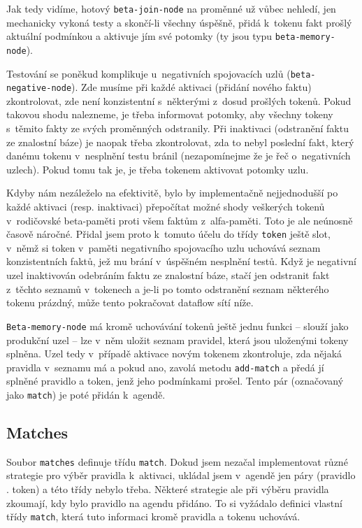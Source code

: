Jak tedy vidíme, hotový \verb|beta-join-node| na proměnné už vůbec nehledí,
jen mechanicky vykoná testy a skončí-li všechny úspěšně, přidá k~tokenu
fakt prošlý aktuální podmínkou a aktivuje jím své potomky (ty jsou typu
\verb|beta-memory-node|).

Testování se poněkud komplikuje u~negativních spojovacích uzlů
(\verb|beta-negative-node|). Zde musíme při každé aktivaci (přidání nového
faktu) zkontrolovat, zde není konzistentní s~některými z~dosud prošlých tokenů.
Pokud takovou shodu nalezneme, je třeba informovat potomky, aby všechny
tokeny s~těmito fakty ze svých proměnných odstranily. Při inaktivaci
(odstranění faktu ze znalostní báze) je naopak třeba zkontrolovat, zda to
nebyl poslední fakt, který danému tokenu v~nesplnění testu bránil (nezapomínejme
že je řeč o~negativních uzlech). Pokud tomu tak je, je třeba tokenem aktivovat
potomky uzlu.

Kdyby nám nezáleželo na efektivitě, bylo by implementačně nejjednodušší po
každé aktivaci (resp. inaktivaci) přepočítat možné shody veškerých tokenů
v~rodičovské beta-paměti proti všem faktům z~alfa-paměti. Toto je ale
neúnosně časově náročné. Přidal jsem proto k~tomuto účelu do třídy \verb|token|
ještě slot, v~němž si token v~paměti negativního spojovacího uzlu uchovává
seznam konzistentních faktů, jež mu brání v~úspěšném nesplnění testů. Když
je negativní uzel inaktivován odebráním faktu ze znalostní báze, stačí
jen odstranit fakt z~těchto seznamů v~tokenech a je-li po tomto odstranění
seznam některého tokenu prázdný, může tento pokračovat dataflow sítí níže.

\verb|Beta-memory-node| má kromě uchovávání tokenů ještě jednu funkci --
slouží jako produkční uzel -- lze v~něm uložit seznam pravidel, která jsou
uloženými tokeny splněna. Uzel tedy v~případě aktivace novým tokenem
zkontroluje, zda nějaká pravidla v~seznamu má a pokud ano, zavolá metodu
\verb|add-match| a předá jí splněné pravidlo a token, jenž jeho podmínkami
prošel. Tento pár (označovaný jako \verb|match|) je poté přidán k~agendě.
\subsection{Matches}
Soubor \verb|matches| definuje třídu \verb|match|. Dokud jsem nezačal
implementovat různé strategie pro výběr pravidla k~aktivaci, ukládal jsem
v~agendě jen páry (pravidlo . token) a této třídy nebylo třeba. Některé strategie ale
při výběru pravidla zkoumají, kdy bylo pravidlo na agendu přidáno. To si
vyžádalo definici vlastní třídy \verb|match|, která tuto informaci kromě
pravidla a tokenu uchovává.
